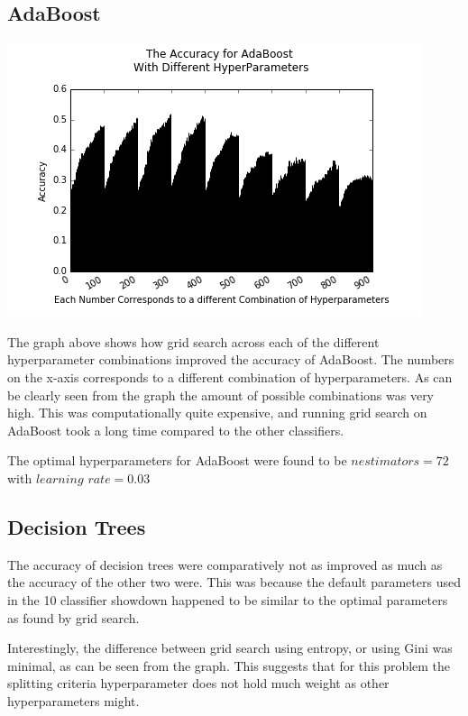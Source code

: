 \documentclass{article}
\begin{document}
\subsection{AdaBoost}

\includegraphics[scale=0.6]{adaboost_crop}

The graph above shows how grid search across each of the different hyperparameter combinations improved the accuracy of AdaBoost. The numbers on the x-axis corresponds to a different combination of hyperparameters. As can be clearly seen from the graph the amount of possible combinations was very high. This was computationally quite expensive, and running grid search on AdaBoost took a long time compared to the other classifiers. 

The optimal hyperparameters for AdaBoost were found to be $n$\textunderscore $estimators = 72$ with $learning$ \textunderscore $rate = 0.03$

\subsection{Decision Trees}




The accuracy of decision trees were comparatively not as improved as much as the accuracy of the other two were. This was because the default parameters used in the 10 classifier showdown \cite{showdown} happened to be similar to the optimal parameters as found by grid search. 

Interestingly, the difference between grid search using entropy, or using Gini was minimal, as can be seen from the graph. This suggests that for this problem the splitting criteria hyperparameter does not hold much weight as other hyperparameters might. 
\end{document}
